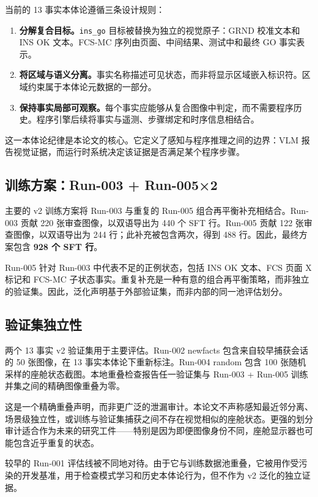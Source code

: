 当前的 13 事实本体论遵循三条设计规则：

\begin{enumerate}
\item \textbf{分解复合目标。}\texttt{ins\_go} 目标被替换为独立的视觉原子：GRND 校准文本和 INS OK 文本。FCS-MC 序列由页面、中间结果、测试中和最终 GO 事实表示。

\item \textbf{将区域与语义分离。}事实名称描述可见状态，而非将显示区域嵌入标识符。区域约束属于本体论元数据的一部分。

\item \textbf{保持事实局部可观察。}每个事实应能够从复合图像中判定，而不需要程序历史。程序引擎后续将事实与遥测、步骤绑定和时序信息相结合。
\end{enumerate}

这一本体论纪律是本论文的核心。它定义了感知与程序推理之间的边界：VLM 报告视觉证据，而运行时系统决定该证据是否满足某个程序步骤。

\subsection{训练方案：Run-003 + Run-005×2}

主要的 v2 训练方案将 Run-003 与重复的 Run-005 组合再平衡补充相结合。Run-003 贡献 220 张审查图像，以双语导出为 440 个 SFT 行。Run-005 贡献 122 张审查图像，以双语导出为 244 行；此补充被包含两次，得到 488 行。因此，最终方案包含 \textbf{928 个 SFT 行}。

Run-005 针对 Run-003 中代表不足的正例状态，包括 INS OK 文本、FCS 页面 X 标记和 FCS-MC 子状态事实。重复补充是一种有意的组合再平衡策略，而非独立的验证集。因此，泛化声明基于外部验证集，而非内部的同一池评估划分。

\subsection{验证集独立性}

两个 13 事实 v2 验证集用于主要评估。Run-002 newfacts 包含来自较早捕获会话的 50 张图像，在 13 事实本体论下重新标注。Run-004 random 包含 100 张随机采样的座舱状态截图。本地重叠检查报告任一验证集与 Run-003 + Run-005 训练并集之间的精确图像重叠为零。

这是一个精确重叠声明，而非更广泛的泄漏审计。本论文不声称感知最近邻分离、场景级独立性，或训练与验证集捕获之间不存在视觉相似的座舱状态。更强的划分审计适合作为未来的研究工件——特别是因为即便图像身份不同，座舱显示器也可能包含近乎重复的状态。

较早的 Run-001 评估线被不同地对待。由于它与训练数据池重叠，它被用作受污染的开发基准，用于检查模式学习和历史本体论行为，但不作为 v2 泛化的独立证据。

